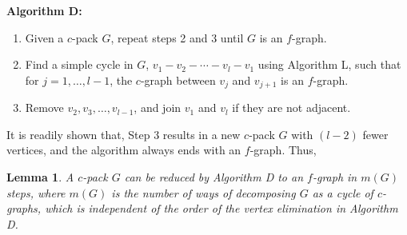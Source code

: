 \documentclass[preprint]{revtex4-1}
\newtheorem{lemm}[thrm]{Lemma}
\begin{document}
\textbf{Algorithm D:}
\begin{enumerate}
  \item
    Given a $c$-pack $G$,
      repeat steps 2 and 3 until $G$ is an $f$-graph.
  \item
    Find a simple cycle in $G$,
      $v_1 - v_2 - \cdots - v_l - v_1$
      using Algorithm L,
      such that
      for $j = 1, \dots, l-1$,
      the $c$-graph between $v_j$ and $v_{j+1}$
      is an $f$-graph.
  \item
    Remove $v_2, v_3, \dots, v_{l-1}$,
      and join $v_1$ and $v_l$ if they are not adjacent.
\end{enumerate}
%
It is readily shown that,
  Step 3 results in a new $c$-pack $G$
  with $(l - 2)$ fewer vertices,
  and the algorithm always ends with an $f$-graph.
%
Thus,


\begin{lemm}
  A $c$-pack $G$ can be reduced
    by Algorithm D to an $f$-graph in $m(G)$ steps,
    where $m(G)$ is the number of ways of decomposing
    $G$ as a cycle of $c$-graphs,
    which is independent of the order of the vertex elimination
    in Algorithm D.
\label{thm:hncdecomp}
\end{lemm}
\end{document}
